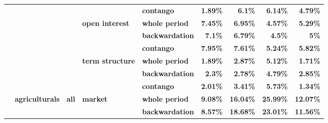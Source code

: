 \documentclass[
  authoryear,
  preprint,
  3p]{elsarticle}
\begin{document}
\begin{longtable}[t]{>{}l>{}l>{}l>{}l>{}l>{}r>{}r>{}r>{}r}
\textbf{} & \textbf{} & \textbf{} & \textbf{} & \textbf{contango} & \textcolor[HTML]{4285f4}{\textbf{1.89\%}} & \textcolor[HTML]{4285f4}{\textbf{6.1\%}} & \textcolor[HTML]{4285f4}{\textbf{6.14\%}} & \textcolor[HTML]{4285f4}{\textbf{4.79\%}}\\
\textbf{} & \textbf{} & \textbf{} & \textbf{open interest} & \textbf{whole period} & \textcolor[HTML]{4285f4}{\textbf{7.45\%}} & \textcolor[HTML]{4285f4}{\textbf{6.95\%}} & \textcolor[HTML]{4285f4}{\textbf{4.57\%}} & \textcolor[HTML]{4285f4}{\textbf{5.29\%}}\\
\textbf{} & \textbf{} & \textbf{} & \textbf{} & \textbf{backwardation} & \textcolor[HTML]{4285f4}{\textbf{7.1\%}} & \textcolor[HTML]{4285f4}{\textbf{6.79\%}} & \textcolor[HTML]{4285f4}{\textbf{4.5\%}} & \textcolor[HTML]{4285f4}{\textbf{5\%}}\\
\addlinespace
\textbf{} & \textbf{} & \textbf{} & \textbf{} & \textbf{contango} & \textcolor[HTML]{4285f4}{\textbf{7.95\%}} & \textcolor[HTML]{4285f4}{\textbf{7.61\%}} & \textcolor[HTML]{4285f4}{\textbf{5.24\%}} & \textcolor[HTML]{4285f4}{\textbf{5.82\%}}\\
\textbf{} & \textbf{} & \textbf{} & \textbf{term structure} & \textbf{whole period} & \textcolor[HTML]{4285f4}{\textbf{1.89\%}} & \textcolor[HTML]{4285f4}{\textbf{2.87\%}} & \textcolor[HTML]{4285f4}{\textbf{5.12\%}} & \textcolor[HTML]{4285f4}{\textbf{1.71\%}}\\
\textbf{} & \textbf{} & \textbf{} & \textbf{} & \textbf{backwardation} & \textcolor[HTML]{4285f4}{\textbf{2.3\%}} & \textcolor[HTML]{4285f4}{\textbf{2.78\%}} & \textcolor[HTML]{4285f4}{\textbf{4.79\%}} & \textcolor[HTML]{4285f4}{\textbf{2.85\%}}\\
\textbf{} & \textbf{} & \textbf{} & \textbf{} & \textbf{contango} & \textcolor[HTML]{4285f4}{\textbf{2.01\%}} & \textcolor[HTML]{4285f4}{\textbf{3.41\%}} & \textcolor[HTML]{4285f4}{\textbf{5.73\%}} & \textcolor[HTML]{4285f4}{\textbf{1.34\%}}\\
\textbf{} & \textbf{agriculturals} & \textbf{all} & \textbf{market} & \textbf{whole period} & \textcolor[HTML]{4285f4}{\textbf{9.08\%}} & \textcolor[HTML]{4285f4}{\textbf{16.04\%}} & \textcolor[HTML]{4285f4}{\textbf{25.99\%}} & \textcolor[HTML]{4285f4}{\textbf{12.07\%}}\\
\addlinespace
\textbf{} & \textbf{} & \textbf{} & \textbf{} & \textbf{backwardation} & \textcolor[HTML]{4285f4}{\textbf{8.57\%}} & \textcolor[HTML]{4285f4}{\textbf{18.68\%}} & \textcolor[HTML]{4285f4}{\textbf{23.01\%}} & \textcolor[HTML]{4285f4}{\textbf{11.56\%}}\\

\end{longtable}
\end{document}
